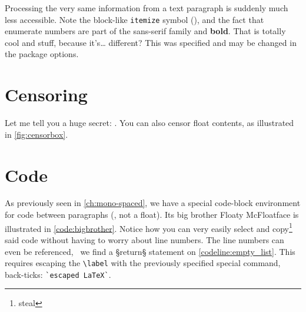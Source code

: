 Processing the very same information from a text paragraph is suddenly much less accessible.
Note the block-like \texttt{itemize} symbol (\smblksquare{}), and the fact that enumerate numbers are part of the {\sffamily sans-serif family} and \textbf{bold}.
That is totally cool and stuff, because it's\dots{} different?
This was specified and may be changed in the  package options.
\section{Censoring}
Let me tell you a huge secret:  .
You can also censor float contents, as illustrated in \cref{fig:censorbox}.
\begin{figure}
	{%
	}
\end{figure}
\section{Code}
As previously seen in \cref{ch:mono-spaced}, we have a special code-block environment for code between paragraphs (, not a float).
Its big brother Floaty McFloatface is illustrated in \cref{code:bigbrother}.
Notice how you can very easily select and copy\footnote{steal} said code without having to worry about line numbers.
The line numbers can even be referenced, \ we find a §return§ statement on \cref{codeline:empty_list}.
This requires escaping the \verb|\label| with the previously specified special command, back-ticks: \verb|`escaped LaTeX`|.

